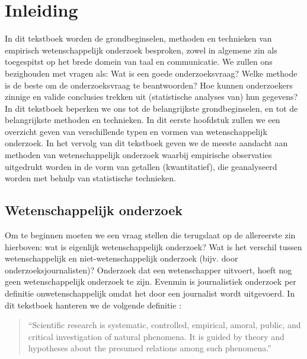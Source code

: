 \documentclass[
]{book}
\begin{document}
\hypertarget{ch:inleiding}{%
\chapter{Inleiding}\label{ch:inleiding}}

In dit tekstboek worden de grondbeginselen, methoden en technieken van
empirisch wetenschappelijk onderzoek besproken, zowel in algemene zin
als toegespitst op het brede domein van taal en communicatie. We zullen ons bezighouden met vragen als: Wat is een goede onderzoeksvraag? Welke methode is de beste om de onderzoeksvraag te beantwoorden? Hoe kunnen onderzoekers zinnige en valide conclusies trekken uit (statistische analyses van) hun gegevens? In dit tekstboek beperken we ons tot de belangrijkste grondbeginselen, en tot de belangrijkste methoden en technieken. In dit eerste hoofdstuk zullen we een overzicht geven van verschillende typen en vormen van wetenschappelijk onderzoek. In het vervolg van dit tekstboek geven we de meeste aandacht aan methoden van wetenschappelijk onderzoek waarbij empirische observaties uitgedrukt worden in de vorm van getallen (kwantitatief), die geanalyseerd worden met behulp van statistische technieken.

\hypertarget{sec:wetenschappelijk-onderzoek}{%
\section{Wetenschappelijk onderzoek}\label{sec:wetenschappelijk-onderzoek}}

Om te beginnen moeten we een vraag stellen die terugslaat op de
allereerste zin hierboven: wat is eigenlijk wetenschappelijk onderzoek?
Wat is het verschil tussen wetenschappelijk en niet-wetenschappelijk
onderzoek (bijv. door onderzoeksjournalisten)? Onderzoek dat een
wetenschapper uitvoert, hoeft nog geen wetenschappelijk onderzoek te
zijn. Evenmin is journalistiek onderzoek per definitie
onwetenschappelijk omdat het door een journalist wordt uitgevoerd. In
dit tekstboek hanteren we de volgende definitie \citep[p.14]{KL00}:

\begin{quote}
``Scientific
research is systematic, controlled, empirical, amoral, public, and
critical investigation of natural phenomena. It is guided by theory and hypotheses about the presumed relations among such phenomena.''
\end{quote}
\end{document}

